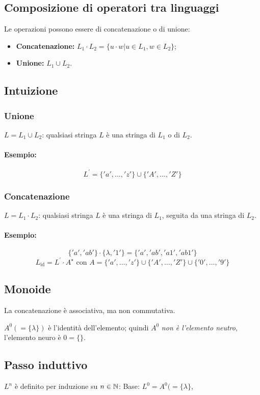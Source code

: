 \subsection{Composizione di operatori tra linguaggi}
Le operazioni possono essere di concatenazione o di unione:
\begin{itemize}
  \item \textbf{Concatenazione:} $L_1\cdot L_2 = \{u\cdot w|u\in L_1, w\in L_2\}$;
  \item \textbf{Unione:} $L_1\cup L_2$.
\end{itemize}

\subsection{Intuizione}
\subsubsection{Unione}
$L=L_1\cup L_2$: qualsiasi stringa $L$ è una stringa di $L_1$ o di $L_2$.
\paragraph{Esempio:}
\[L^\prime = \{'a',\dots,'z'\}\cup\{'A',\dots,'Z'\} \]

\subsubsection{Concatenazione}
$L=L_1\cdot L_2$: qualsiasi stringa $L$ è una stringa di $L_1$, seguita da una
stringa di $L_2$.
\paragraph{Esempio:}
\[\{'a','ab'\}\cdot\{\lambda,'1'\}=\{'a','ab','a1','ab1'\}\]
\[L_{\text{id}}=L^\prime\cdot A^\star \text{ con }A=\{'a',\dots,'z'\}\cup\{'A',\dots,'Z'\}\cup\{'0',\dots,'9'\} \]

\subsection{Monoide}
La concatenazione è associativa, ma non commutativa.

$A^0(=\{\lambda\})$ è l'identità dell'elemento; quindi $A^0$ \emph{non è
l'elemento neutro}, l'elemento neuro è $0=\{\}$.

\subsection{Passo induttivo}
$L^n$ è definito per induzione su $n\in\mathbb{N}$:
Base: $L^0=A^0(=\{\lambda\}$,

